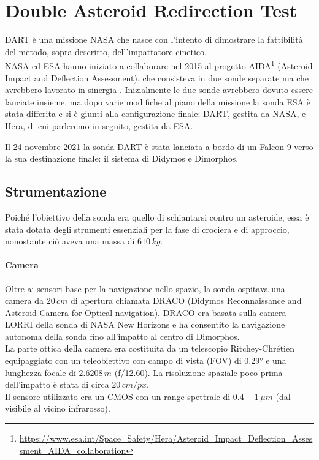 \documentclass[a4paper,11pt,openright]{book}
\begin{document}
\section{Double Asteroid Redirection Test}\label{sec:DART}
DART è una missione NASA che nasce con l'intento di dimostrare la fattibilità del metodo, sopra descritto, dell'impattatore cinetico.\\
NASA ed ESA hanno iniziato a collaborare nel 2015 al progetto AIDA\footnote{\href{https://www.esa.int/Space_Safety/Hera/Asteroid_Impact_Deflection_Assessment_AIDA_collaboration}{https://www.esa.int/Space\_Safety/Hera/Asteroid\_Impact\_Deflection\_Assessment\_AIDA\_collaboration}} (Asteroid Impact and Deflection Assessment), che consisteva in due sonde separate ma che avrebbero lavorato in sinergia \citep{michel_european_2018}. Inizialmente le due sonde avrebbero dovuto essere lanciate insieme, ma dopo varie modifiche al piano della missione la sonda ESA è stata differita e si è giunti alla configurazione finale: DART, gestita da NASA, e Hera, di cui parleremo in seguito, gestita da ESA.

Il 24 novembre 2021 la sonda DART è stata lanciata a bordo di un Falcon 9 verso la sua destinazione finale: il sistema di Didymos e Dimorphos.

\subsection{Strumentazione}
Poiché l'obiettivo della sonda era quello di schiantarsi contro un asteroide, essa è stata dotata degli strumenti essenziali per la fase di crociera e di approccio, nonostante ciò aveva una massa di $610\,kg$.

\paragraph*{Camera}
Oltre ai sensori base per la navigazione nello spazio, la sonda ospitava una camera da $20\,cm$ di apertura chiamata DRACO (Didymos Reconnaissance and Asteroid Camera for Optical navigation). DRACO era basata sulla camera LORRI della sonda di NASA New Horizons e ha consentito la navigazione autonoma della sonda fino all'impatto al centro di Dimorphos.\\
La parte ottica della camera era costituita da un telescopio Ritchey-Chrétien equipaggiato con un teleobiettivo con campo di vista (FOV) di 0.29° e una lunghezza focale di $2.6208\,m$ (f/12.60). La risoluzione spaziale poco prima dell'impatto è stata di circa $20\,cm/px$.\\
Il sensore utilizzato era un CMOS con un range spettrale di $0.4-1\,\mu m$ (dal visibile al vicino infrarosso).
\end{document}
